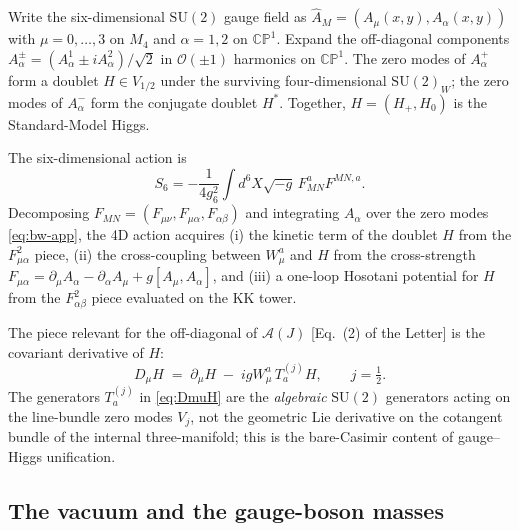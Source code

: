 \documentclass[aps,prd,onecolumn,superscriptaddress,nofootinbib,reprint]{revtex4-2}
\newcommand{\half}{\tfrac12}
\newcommand{\cA}{\mathcal{A}}
\newcommand{\cO}{\mathcal{O}}
\newcommand{\SU}{\mathrm{SU}}
\newcommand{\CP}{\mathbb{CP}}
\begin{document}
Write the six-dimensional $\SU(2)$ gauge field as
$\hat A_{M}=(A_{\mu}(x,y),A_{\alpha}(x,y))$ with $\mu=0,\dots,3$ on
$M_{4}$ and $\alpha=1,2$ on $\CP^{1}$.  Expand the off-diagonal
components $A_{\alpha}^{\pm}=(A_{\alpha}^{1}\pm iA_{\alpha}^{2})/\sqrt 2$
in $\cO(\pm 1)$ harmonics on $\CP^{1}$.  The zero modes of $A_{\alpha}^{+}$
form a doublet $H\in V_{1/2}$ under the surviving four-dimensional
$\SU(2)_{W}$; the zero modes of $A_{\alpha}^{-}$ form the conjugate
doublet $H^{*}$.  Together, $H=(H_{+},H_{0})$ is the Standard-Model
Higgs.

The six-dimensional action is
\begin{equation}
  S_{6}=-\frac{1}{4g_{6}^{2}}\int d^{6}X\sqrt{-g}\,
  F_{MN}^{a}F^{MN,a}.
\label{eq:S6}
\end{equation}
Decomposing $F_{MN}=(F_{\mu\nu},F_{\mu\alpha},F_{\alpha\beta})$ and
integrating $A_{\alpha}$ over the zero modes \eqref{eq:bw-app}, the
4D action acquires (i) the kinetic term of the doublet $H$ from the
$F_{\mu\alpha}^{2}$ piece, (ii) the cross-coupling between $W_{\mu}^{a}$
and $H$ from the cross-strength
$F_{\mu\alpha}=\partial_{\mu}A_{\alpha}-\partial_{\alpha}A_{\mu}+g[A_{\mu},A_{\alpha}]$,
and (iii) a one-loop Hosotani potential for $H$ from the
$F_{\alpha\beta}^{2}$ piece evaluated on the KK tower.

The piece relevant for the off-diagonal of $\cA(J)$ [Eq.~(2) of the Letter] is the
covariant derivative of $H$:
\begin{equation}
  D_{\mu}H\;=\;\partial_{\mu}H\;-\;i g W_{\mu}^{a}\,T_{a}^{(j)}H,
  \qquad j=\half.
\label{eq:DmuH}
\end{equation}
The generators $T_{a}^{(j)}$ in \eqref{eq:DmuH} are the \emph{algebraic}
$\SU(2)$ generators acting on the line-bundle zero modes $V_{j}$, not
the geometric Lie derivative on the cotangent bundle of the internal
three-manifold; this is the bare-Casimir content of gauge--Higgs
unification.

\subsection{The vacuum and the gauge-boson masses}
\end{document}
